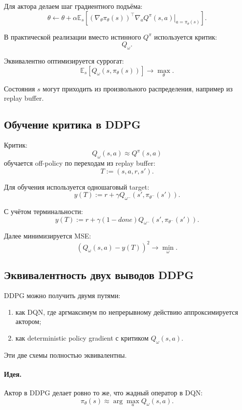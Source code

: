 \documentclass[12pt,a4paper]{article}
\begin{document}
Для актора делаем шаг градиентного подъёма:
\[
\theta
\leftarrow
\theta
+
\alpha
\mathbb E_s
\left[
\left(
\nabla_\theta \pi_\theta(s)
\right)^\top
\left.
\nabla_a Q^\pi(s,a)
\right|_{a=\pi_\theta(s)}
\right].
\]

В практической реализации вместо истинного $Q^\pi$ используется критик:
\[
Q_\omega.
\]

Эквивалентно оптимизируется суррогат:
\[
\mathbb E_s
\left[
Q_\omega(s,\pi_\theta(s))
\right]
\to
\max_\theta.
\]

Состояния $s$ могут приходить из произвольного распределения, например из replay buffer.

\subsection{Обучение критика в DDPG}

Критик:
\[
Q_\omega(s,a)
\approx
Q^\pi(s,a)
\]
обучается off-policy по переходам из replay buffer:
\[
T:=(s,a,r,s').
\]

Для обучения используется одношаговый target:
\[
y(T)
:=
r
+
\gamma
Q_{\omega^-}
\left(
s',
\pi_{\theta^-}(s')
\right).
\]

С учётом терминальности:
\[
y(T)
:=
r
+
\gamma(1-done)
Q_{\omega^-}
\left(
s',
\pi_{\theta^-}(s')
\right).
\]

Далее минимизируется MSE:
\[
\left(
Q_\omega(s,a)-y(T)
\right)^2
\to
\min_\omega.
\]

\subsection{Эквивалентность двух выводов DDPG}

DDPG можно получить двумя путями:

\begin{enumerate}
    \item как DQN, где аргмаксимум по непрерывному действию аппроксимируется актором;
    \item как deterministic policy gradient с критиком $Q_\omega(s,a)$.
\end{enumerate}

Эти две схемы полностью эквивалентны.

\paragraph{Идея.}

Актор в DDPG делает ровно то же, что жадный оператор в DQN:
\[
\pi_\theta(s)
\approx
\arg\max_a Q_\omega(s,a).
\]
\end{document}
